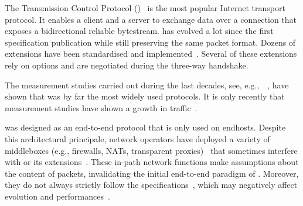 
The Transmission Control Protocol (\tcp)~\cite{rfc793} is the most
popular Internet transport protocol. It enables a client and a server
to exchange data over a connection that exposes a bidirectional
reliable bytestream. \tcp has evolved a lot since the first specification publication while still preserving the same packet format. Dozens of \tcp extensions have been standardised and implemented~\cite{RFC7414}. Several of these extensions rely on \tcp options and are negotiated during the three-way handshake.

The measurement studies carried out during the last decades, see, e.g.,~ \cite{paxson1994growth,claffy1993traffic,maier2009dominant,trevisan2020five}, have shown that \tcp was by far the most widely used protocols. It is
only recently that measurement studies have shown a growth in \udp
traffic~\cite{trevisan2020five}.



\tcp was designed as an end-to-end protocol that is only used on endhosts. Despite this architectural principale, network operators have deployed a variety of middleboxes (e.g., firewalls, NATs, transparent
proxies)~\cite{mCloud} that sometimes interfere with \tcp or its extensions~\cite{medina2004measuring, honda2011still, edeline2019bottom}.
These in-path network functions make assumptions about the content of \tcp
packets, invalidating the initial end-to-end paradigm of \tcp. Moreover, they do not always strictly follow the \tcp specifications~\cite{honda2011still, hesmans2013tcp}, which may negatively affect \tcp evolution and performances~\cite{edeline2020evaluating}.





